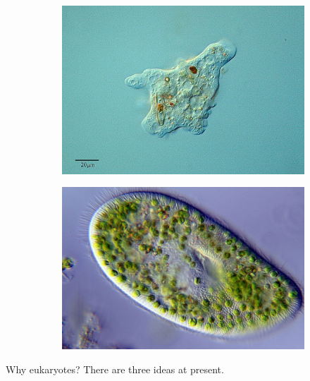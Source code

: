 \documentclass[]{article}
\begin{document}
\begin{figure}[H]
	\caption{Cellular predators, symbiotic hosts}
	\label{figs:Cellular:predators:symbiotic:hosts}
	\begin{subfigure}[b]{0.45\textwidth}
		\caption{ }
		\label{figs:Cellular:predators:symbiotic:hosts1}
		\includegraphics[width=\textwidth]{Eukaryotes1}
	\end{subfigure}
	\begin{subfigure}[b]{0.45\textwidth}
		\caption{ }
		\label{figs:Cellular:predators:symbiotic:hosts2}
		\includegraphics[width=\textwidth]{Eukaryotes2}
	\end{subfigure}
\end{figure}
Why eukaryotes? There are three ideas at present.
\end{document}

